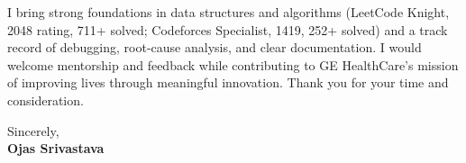 \documentclass[a4paper,11pt]{article}
\begin{document}
I bring strong foundations in data structures and algorithms (LeetCode Knight, 2048 rating, 711+ solved; Codeforces Specialist, 1419, 252+ solved) and a track record of debugging, root-cause analysis, and clear documentation. I would welcome mentorship and feedback while contributing to GE HealthCare's mission of improving lives through meaningful innovation. Thank you for your time and consideration.

Sincerely, \\
\vspace{8mm}
\textbf{Ojas Srivastava}
\end{document}
